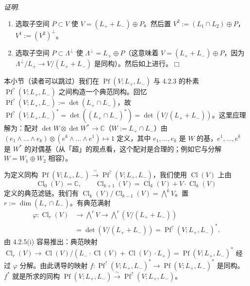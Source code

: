 \emph{证明.}
\begin{enumerate}[label=(\roman*),leftmargin=2.2em]
\item 选取子空间 $P\subset V$ 使 $V=(L_{+}+L_{-})\oplus P$。然后置 $V^{2}:=(L_{1}\cap L_{2})\oplus P$，$V^{1}:=(V^{2})^{\perp}$。
\item 选取子空间 $P\subset\Lambda^{\perp}$ 使 $\Lambda^{\perp}=L_{+}\oplus P$（这意味着 $V=(L_{+}+L_{-})\oplus P$，因为 $\Lambda^{\perp}/L_{+}\to V/(L_{+}+L_{-})$ 是同构）。然后如上进行。\hfill$\Box$
\end{enumerate}

 本小节（读者可以跳过）我们在 $\operatorname{Pf}(V;L_{+},L_{-})$ 与 4.2.3 的朴素 $\operatorname{Pf}^{?}(V;L_{+},L_{-})$ 之间构造一个典范同构。回忆 $\operatorname{Pf}^{?}(V;L_{+},L_{-}):=\det(L_{+}\cap L_{-})$，故 $\operatorname{Pf}^{?}(V;L_{+},L_{-})^{*}=\det((L_{+}\cap L_{-})^{*})=\det(V/(L_{+}+L_{-}))$。这里应理解为：配对 $\det W\otimes\det W^{*}\to\mathbb{C}$（$W:=L_{+}\cap L_{-}$）由 $(e_{1}\wedge\dots\wedge e_{k})\otimes(e^{k}\wedge\dots\wedge e^{1})\mapsto 1$ 定义，其中 $e_{1},\dots,e_{k}$ 是 $W$ 的基，$e^{1},\dots,e^{k}$ 是 $W^{*}$ 的对偶基（从「超」的观点看，这个配对是合理的；例如它与分解 $W=W_{1}\oplus W_{2}$ 相容）。

为定义同构 $\operatorname{Pf}(V;L_{+},L_{-})\xrightarrow{\ \sim\ }\operatorname{Pf}^{?}(V;L_{+},L_{-})$，我们使用 $\operatorname{Cl}(V)$ 上由
\begin{equation}\tag{169}
\operatorname{Cl}_{0}(V)=\mathbb{C},\qquad \operatorname{Cl}_{k+1}(V)=\operatorname{Cl}_{k}(V)+V\cdot\operatorname{Cl}_{k}(V)
\end{equation}
定义的典范滤链。我们有 $\operatorname{Cl}_{k}(V)/\operatorname{Cl}_{k-1}(V)=\bigwedge^{k}V$。置 $r:=\dim(L_{+}\cap L_{-})$。有典范满射
\[
\begin{aligned}
\varphi:\operatorname{Cl}_{r}(V)&\longrightarrow\bigwedge\nolimits^{r}V\longrightarrow\bigwedge\nolimits^{r}(V/(L_{+}+L_{-}))\\
&=\det(V/(L_{+}+L_{-}))=\operatorname{Pf}^{?}(V;L_{+},L_{-})^{*}.
\end{aligned}
\]
由 4.2.5(i) 容易推出：典范映射 $\operatorname{Cl}_{r}(V)\to\operatorname{Cl}(V)/(L_{-}\cdot\operatorname{Cl}(V)+\operatorname{Cl}(V)\cdot L_{+})=\operatorname{Pf}(V;L_{+},L_{-})^{*}$ 经过 $\varphi$ 分解。由此诱导的映射 $f:\operatorname{Pf}^{?}(V;L_{+},L_{-})^{*}\to\operatorname{Pf}(V;L_{+},L_{-})^{*}$ 是同构。$f^{*}$ 就是所求的同构 $\operatorname{Pf}(V;L_{+},L_{-})\xrightarrow{\ \sim\ }\operatorname{Pf}^{?}(V;L_{+},L_{-})$。

